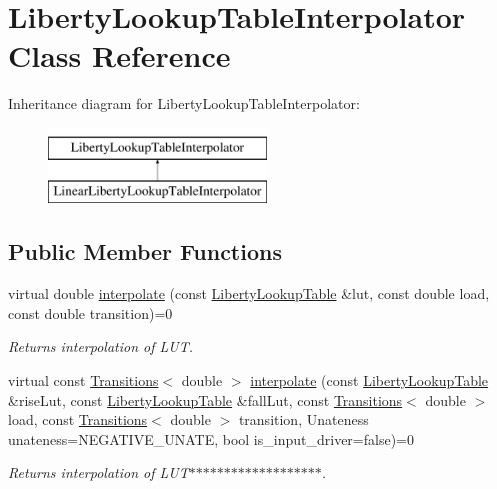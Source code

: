 \hypertarget{classLibertyLookupTableInterpolator}{\section{Liberty\-Lookup\-Table\-Interpolator Class Reference}
\label{classLibertyLookupTableInterpolator}
}
Inheritance diagram for Liberty\-Lookup\-Table\-Interpolator\-:\begin{figure}[H]
\begin{center}
\leavevmode
\includegraphics[height=2.000000cm]{classLibertyLookupTableInterpolator}
\end{center}
\end{figure}
\subsection*{Public Member Functions}
\begin{DoxyCompactItemize}
\item 
virtual double \hyperlink{classLibertyLookupTableInterpolator_ae12e0b9e427488bc933b54a427586f47}{interpolate} (const \hyperlink{structLibertyLookupTable}{Liberty\-Lookup\-Table} \&lut, const double load, const double transition)=0
\begin{DoxyCompactList}\small\item\em Returns interpolation of L\-U\-T. \end{DoxyCompactList}\item 
virtual const \hyperlink{classTransitions}{Transitions}$<$ double $>$ \hyperlink{classLibertyLookupTableInterpolator_a3f840a4246b193e9e620b3ec8cadb720}{interpolate} (const \hyperlink{structLibertyLookupTable}{Liberty\-Lookup\-Table} \&rise\-Lut, const \hyperlink{structLibertyLookupTable}{Liberty\-Lookup\-Table} \&fall\-Lut, const \hyperlink{classTransitions}{Transitions}$<$ double $>$ load, const \hyperlink{classTransitions}{Transitions}$<$ double $>$ transition, Unateness unateness=N\-E\-G\-A\-T\-I\-V\-E\-\_\-\-U\-N\-A\-T\-E, bool is\-\_\-input\-\_\-driver=false)=0
\begin{DoxyCompactList}\small\item\em Returns interpolation of L\-U\-T$\ast$$\ast$$\ast$$\ast$$\ast$$\ast$$\ast$$\ast$$\ast$$\ast$$\ast$$\ast$$\ast$$\ast$$\ast$$\ast$$\ast$$\ast$$\ast$. \end{DoxyCompactList}\end{DoxyCompactItemize}
